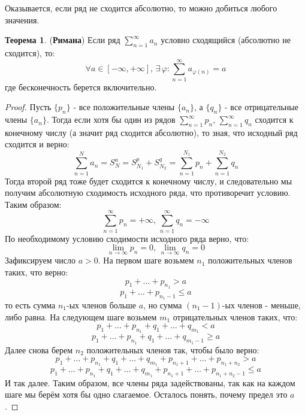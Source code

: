 \documentclass[12pt]{article}
\theoremstyle{definition}
\newtheorem{theorem}{Теорема}
\begin{document}
Оказывается, если ряд не сходится абсолютно, то можно добиться любого значения.

\begin{theorem}(\textbf{Римана})
	Если ряд $\displaystyle \sum\limits_{n = 1 }^{\infty} a_n$ условно сходящийся (абсолютно не сходится), то: 
	$$
		\forall a \in [-\infty,+\infty], \, \exists \, \varphi \colon \sum\limits_{n = 1 }^{\infty} a_{\varphi(n)} = a
	$$ 
	где бесконечность берется включительно.
\end{theorem}
\begin{proof}
	Пусть $\{p_n\}$ - все положительные члены $\{a_n\}$, а $\{q_n\}$ - все отрицательные члены $\{a_n\}$. Тогда если хотя бы один из рядов $\displaystyle \sum\limits_{n = 1}^{\infty}p_n, \, \displaystyle \sum\limits_{n = 1}^{\infty}q_n$ сходится к конечному числу (а значит ряд сходится абсолютно), то зная, что исходный ряд сходится и верно:
	$$
		\displaystyle \sum\limits_{n = 1}^{N}a_n = S_N^a = S_{N_1}^p + S_{N_2}^q = \displaystyle \sum\limits_{n = 1}^{N_1}p_n + \displaystyle \sum\limits_{n = 1}^{N_2}q_n
	$$
	Тогда второй ряд тоже будет сходится к конечному числу, и следовательно мы получим абсолютную сходимость исходного ряда, что противоречит условию. Таким образом:
	$$
		\displaystyle \sum\limits_{n = 1}^{\infty}p_n = +\infty, \, \displaystyle \sum\limits_{n = 1}^{\infty}q_n = -\infty
	$$
	По необходимому условию сходимости исходного ряда верно, что: 
	$$
		\lim\limits_{n \to \infty} p_n = 0, \, \lim\limits_{n \to \infty}q_n = 0
	$$
	Зафиксируем число $a > 0$. На первом шаге возьмем $n_1$ положительных членов таких, что верно:
	$$
		p_1 + \dotsc + p_{n_1} > a
	$$
	$$	
		p_1 + \dotsc + p_{n_1 - 1} \leq a
	$$
	то есть сумма $n_1$-ых членов больше $a$, но сумма $(n_1 - 1)$-ых членов - меньше, либо равна. На следующем шаге возьмем $m_1$ отрицательных членов таких, что:
	$$
		p_1 + \dotsc + p_{n_1} + q_1 + \dotsc + q_{m_1} < a
	$$
	$$	
		p_1 + \dotsc + p_{n_1} + q_1 + \dotsc + q_{m_1 -1} \geq a
	$$
	\newpage
	Далее снова берем $n_2$ положительных членов так, чтобы было верно:
	$$
		p_1 + \dotsc + p_{n_1} + q_1 + \dotsc + q_{m_1} + p_{n_1 + 1} + \dotsc + p_{n_1 + n_2} > a
	$$
	$$
		p_1 + \dotsc + p_{n_1} + q_1 + \dotsc + q_{m_1} + p_{n_1 + 1} + \dotsc + p_{n_1 + n_2 - 1} \leq a
	$$
	И так далее. Таким образом, все члены ряда задействованы, так как на каждом шаге мы берём хотя бы одно слагаемое. Осталось понять, почему предел это $a$. 
	

\end{proof}
\end{document}
